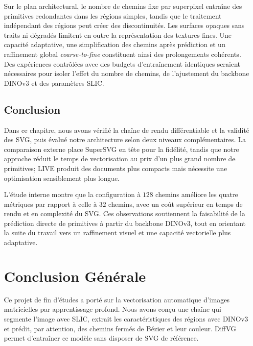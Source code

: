 \documentclass[12pt, a4paper, oneside]{report}
\begin{document}
Sur le plan architectural, le nombre de chemins fixe par superpixel entraîne des primitives redondantes dans les régions simples, tandis que le traitement indépendant des régions peut créer des discontinuités. Les surfaces opaques sans traits ni dégradés limitent en outre la représentation des textures fines. Une capacité adaptative, une simplification des chemins après prédiction et un raffinement global \textit{coarse-to-fine} constituent ainsi des prolongements cohérents. Des expériences contrôlées avec des budgets d'entraînement identiques seraient nécessaires pour isoler l'effet du nombre de chemins, de l'ajustement du backbone DINOv3 et des paramètres SLIC.

\section{Conclusion}

Dans ce chapitre, nous avons vérifié la chaîne de rendu différentiable et la validité des SVG, puis évalué notre architecture selon deux niveaux complémentaires. La comparaison externe place SuperSVG en tête pour la fidélité, tandis que notre approche réduit le temps de vectorisation au prix d'un plus grand nombre de primitives; LIVE produit des documents plus compacts mais nécessite une optimisation sensiblement plus longue.

L'étude interne montre que la configuration à $128$ chemins améliore les quatre métriques par rapport à celle à $32$ chemins, avec un coût supérieur en temps de rendu et en complexité du SVG. Ces observations soutiennent la faisabilité de la prédiction directe de primitives à partir du backbone DINOv3, tout en orientant la suite du travail vers un raffinement visuel et une capacité vectorielle plus adaptative.



\chapter*{Conclusion Générale}

Ce projet de fin d'études a porté sur la vectorisation automatique d'images matricielles par
apprentissage profond. Nous avons conçu une chaîne qui segmente l'image avec SLIC, extrait
les caractéristiques des régions avec DINOv3 et prédit, par attention, des chemins fermés de
Bézier et leur couleur. DiffVG permet d'entraîner ce modèle sans disposer de SVG de référence.
\end{document}
